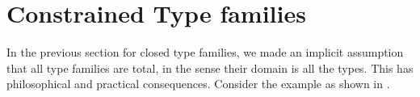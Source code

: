 \documentclass[format=acmsmall,manuscript,review,screen,nonacm,margin=1in,11pt]{acmart}
\begin{document}
\newcommand\SApp{
  \ib{\irule[\trule{s-app}]
    {\stepsto {\Tm_1} {\Tm'_1}};
    {\stepsto {\Tm_1\App\Tm_2} {\Tm'_1\App\Tm_2}}}
}
\newcommand\STApp{
  \ib{\irule[\trule{s-tapp}]
    {\stepsto {\Tm_1} {\Tm'_1}};
    {\stepsto {\Tm_1\App\tau} {\Tm'_1\App\tau}}}
}

\newcommand\SCApp{
  \ib{\irule[\trule{s-capp}]
    {\stepsto {\Tm_1} {\Tm'_1}};
    {\stepsto {\Tm_1\App\Co} {\Tm'_1\App\Co}}}
}

\newcommand\SCast{
  \ib{\irule[\trule{s-cast}]
    {\stepsto {\Tm_1} {\Tm'_1}};
    {\stepsto {\cast{\Tm_1}\Co} {\cast{\Tm'_1}\Co}}}
}

\newcommand\SBeta{
  \ib{\irule[\trule{s-$\beta$}];
    {\stepsto {(\Lam x \tau \Tm_1)\App\Tm_2} {\Tm_1[x/\Tm_2]}}
  }
}
\newcommand\STBeta{
  \ib{\irule[\trule{s-T$\beta$}];
    {\stepsto {(\TLam \alpha \Tm)\App\tau} {\Tm[\alpha/\tau]}}
  }
}

\newcommand\SPush{
  \ib{\irule[\trule{s-push}]
    {\Co_1 = \sym{\nth 0 \Co}}
    {\Co_2 = \nth 1 \Co};
    {\stepsto {(\cast {\Lam x \tau \Tm} \Co) \App \Tm_1} {\cast {(\Lam x \tau \Tm)\App(\cast{\Tm_1} {\Co_1})} {\Co_2}}}
  }
}
\newcommand\STPush{
  \ib{\irule[\trule{s-tpush}];
    {\stepsto {(\cast {\TLam \alpha \Tm} \Co) \App \tau} {\cast {(\TLam \alpha \Tm)\App\tau} {\Co@\tau}}}
  }
}
\newcommand\STrans{
  \ib{\irule[\trule{s-trans}];
    {\stepsto {\cast {(\cast \Tm \Co)} \MoreCo} {\cast \Tm {\comp\Co\MoreCo}}}
  }
  
}

\section{Constrained Type families}\label{sec:tf-constrained}
In the previous section for closed type families, we made an implicit assumption
that all type families are total, in the sense their domain is all the types.
This has philosophical and practical consequences.
Consider the example as shown in .
\end{document}

